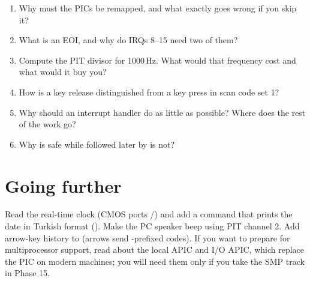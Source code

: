 \documentclass[11pt,a4paper]{article}
\begin{document}
\begin{questionbox}
\begin{enumerate}
  \item Why must the PICs be remapped, and what exactly goes wrong if you skip it?
  \item What is an EOI, and why do IRQs 8--15 need two of them?
  \item Compute the PIT divisor for 1000\,Hz. What would that frequency cost and what would it buy you?
  \item How is a key release distinguished from a key press in scan code set 1?
  \item Why should an interrupt handler do as little as possible? Where does the rest of the work go?
  \item Why is  safe while  followed later by  is not?
\end{enumerate}
\end{questionbox}

\section{Going further}

Read the real-time clock (CMOS ports /) and add a  command that prints the date in
Turkish format (). Make the PC speaker beep using PIT channel 2. Add arrow-key history to
 (arrows send -prefixed codes). If you want to prepare for multiprocessor support, read
about the local APIC and I/O APIC, which replace the PIC on modern machines; you will need them only if you take the
SMP track in Phase 15.

\booklegend
\end{document}
